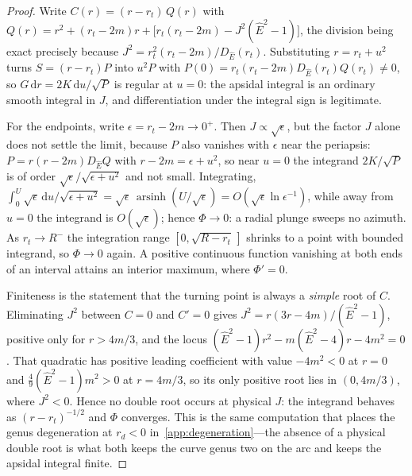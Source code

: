 \documentclass[12pt]{iopart}
\newcommand{\Ehat}{\hat E}
\newcommand{\dd}{\mathrm{d}}
\theoremstyle{plain}
\theoremstyle{definition}
\theoremstyle{plain}
\theoremstyle{remark}
\begin{document}
\begin{proof}
Write $C(r)=(r-r_t)\,Q(r)$ with
$Q(r)=r^2+(r_t-2m)r+\big[r_t(r_t-2m)-J^2(\Ehat^2-1)\big]$, the division being exact
precisely because $J^2=r_t^2(r_t-2m)/D_{\Ehat}(r_t)$. Substituting $r=r_t+u^2$ turns
$S=(r-r_t)P$ into $u^2P$ with $P(0)=r_t(r_t-2m)D_{\Ehat}(r_t)Q(r_t)\neq0$, so
$G\,\dd r=2K\,\dd u/\sqrt P$ is regular at $u=0$: the apsidal integral is an ordinary
smooth integral in $J$, and differentiation under the integral sign is legitimate.

For the endpoints, write $\epsilon=r_t-2m\to0^+$. Then $J\propto\sqrt\epsilon$, but the
factor $J$ alone does not settle the limit, because $P$ also vanishes with $\epsilon$ near
the periapsis: $P=r(r-2m)D_{\Ehat}Q$ with $r-2m=\epsilon+u^2$, so near $u=0$ the integrand
$2K/\sqrt P$ is of order $\sqrt\epsilon/\sqrt{\epsilon+u^2}$ and not small. Integrating,
$\int_0^{U}\sqrt\epsilon\,\dd u/\sqrt{\epsilon+u^2}=\sqrt\epsilon\,\operatorname{arsinh}(U/\sqrt\epsilon)
=O(\sqrt\epsilon\ln\epsilon^{-1})$, while away from $u=0$ the integrand is $O(\sqrt\epsilon)$;
hence $\Phi\to0$: a radial plunge sweeps no azimuth. As $r_t\to R^-$ the integration range $[0,\sqrt{R-r_t}\,]$ shrinks to a point
with bounded integrand, so $\Phi\to0$ again. A positive continuous function vanishing at
both ends of an interval attains an interior maximum, where $\Phi'=0$.

Finiteness is the statement that the turning point is always a \emph{simple} root of $C$.
Eliminating $J^2$ between $C=0$ and $C'=0$ gives $J^2=r(3r-4m)/(\Ehat^2-1)$, positive only
for $r>4m/3$, and the locus $(\Ehat^2-1)r^2-m(\Ehat^2-4)r-4m^2=0$. That quadratic has
positive leading coefficient with value $-4m^2<0$ at $r=0$ and
$\tfrac49(\Ehat^2-1)m^2>0$ at $r=4m/3$, so its only positive root lies in $(0,4m/3)$,
where $J^2<0$. Hence no double root occurs at physical $J$: the integrand behaves as
$(r-r_t)^{-1/2}$ and $\Phi$ converges. This is the same computation that places the
genus degeneration at $r_d<0$ in~\ref{app:degeneration}---the absence of a physical
double root is what both keeps the curve genus two on the arc and keeps the apsidal
integral finite.
\end{proof}
\end{document}
